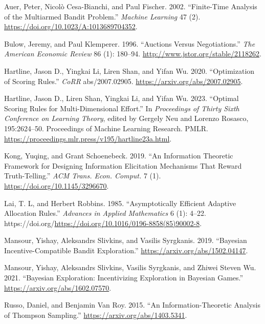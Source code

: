 \documentclass[
  letterpaper,
  numbers=noenddot,
  DIV=11]{scrreprt}
\newlength{\cslhangindent}
\newenvironment{CSLReferences}[2] %
 {\begin{list}{}{%
  \setlength{\itemindent}{0pt}
  \setlength{\leftmargin}{0pt}
  \setlength{\parsep}{0pt}
  \ifodd #1
   \setlength{\leftmargin}{\cslhangindent}
   \setlength{\itemindent}{-1\cslhangindent}
  \fi
  \setlength{\itemsep}{#2\baselineskip}}}
 {\end{list}}
\theoremstyle{definition}
\theoremstyle{plain}
\theoremstyle{plain}
\theoremstyle{remark}
\begin{document}

\label{refs-5}
\begin{CSLReferences}{1}{0}
Auer, Peter, Nicolò Cesa-Bianchi, and Paul Fischer. 2002. {``Finite-Time
Analysis of the Multiarmed Bandit Problem.''} \emph{Machine Learning} 47
(2). \url{https://doi.org/10.1023/A:1013689704352}.

Bulow, Jeremy, and Paul Klemperer. 1996. {``Auctions Versus
Negotiations.''} \emph{The American Economic Review} 86 (1): 180--94.
\url{http://www.jstor.org/stable/2118262}.

Hartline, Jason D., Yingkai Li, Liren Shan, and Yifan Wu. 2020.
{``Optimization of Scoring Rules.''} \emph{CoRR} abs/2007.02905.
\url{https://arxiv.org/abs/2007.02905}.

Hartline, Jason D., Liren Shan, Yingkai Li, and Yifan Wu. 2023.
{``Optimal Scoring Rules for Multi-Dimensional Effort.''} In
\emph{Proceedings of Thirty Sixth Conference on Learning Theory}, edited
by Gergely Neu and Lorenzo Rosasco, 195:2624--50. Proceedings of Machine
Learning Research. PMLR.
\url{https://proceedings.mlr.press/v195/hartline23a.html}.

Kong, Yuqing, and Grant Schoenebeck. 2019. {``An Information Theoretic
Framework for Designing Information Elicitation Mechanisms That Reward
Truth-Telling.''} \emph{ACM Trans. Econ. Comput.} 7 (1).
\url{https://doi.org/10.1145/3296670}.

Lai, T. L, and Herbert Robbins. 1985. {``Asymptotically Efficient
Adaptive Allocation Rules.''} \emph{Advances in Applied Mathematics} 6
(1): 4--22.
https://doi.org/\url{https://doi.org/10.1016/0196-8858(85)90002-8}.

Mansour, Yishay, Aleksandrs Slivkins, and Vasilis Syrgkanis. 2019.
{``Bayesian Incentive-Compatible Bandit Exploration.''}
\url{https://arxiv.org/abs/1502.04147}.

Mansour, Yishay, Aleksandrs Slivkins, Vasilis Syrgkanis, and Zhiwei
Steven Wu. 2021. {``Bayesian Exploration: Incentivizing Exploration in
Bayesian Games.''} \url{https://arxiv.org/abs/1602.07570}.

Russo, Daniel, and Benjamin Van Roy. 2015. {``An Information-Theoretic
Analysis of Thompson Sampling.''} \url{https://arxiv.org/abs/1403.5341}.

\end{CSLReferences}
\end{document}
